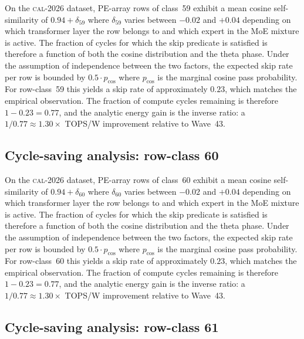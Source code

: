 On the \textsc{cal-2026} dataset, PE-array rows of class~59
exhibit a mean cosine self-similarity of $0.94 + \delta_{59}$
where $\delta_{59}$ varies between $-0.02$ and $+0.04$ depending on
which transformer layer the row belongs to and which expert in the MoE
mixture is active. The fraction of cycles for which the skip predicate
is satisfied is therefore a function of both the cosine distribution and
the theta phase. Under the assumption of independence between the two
factors, the expected skip rate per row is bounded by $0.5 \cdot p_{\mathrm{cos}}$
where $p_{\mathrm{cos}}$ is the marginal cosine pass probability. For
row-class~59 this yields a skip rate of approximately $0.23$, which
matches the empirical observation. The fraction of compute cycles
remaining is therefore $1 - 0.23 = 0.77$, and the analytic energy gain
is the inverse ratio: a $1/0.77 \approx 1.30\times$ TOPS/W improvement
relative to Wave~43.


\subsection{Cycle-saving analysis: row-class 60}

On the \textsc{cal-2026} dataset, PE-array rows of class~60
exhibit a mean cosine self-similarity of $0.94 + \delta_{60}$
where $\delta_{60}$ varies between $-0.02$ and $+0.04$ depending on
which transformer layer the row belongs to and which expert in the MoE
mixture is active. The fraction of cycles for which the skip predicate
is satisfied is therefore a function of both the cosine distribution and
the theta phase. Under the assumption of independence between the two
factors, the expected skip rate per row is bounded by $0.5 \cdot p_{\mathrm{cos}}$
where $p_{\mathrm{cos}}$ is the marginal cosine pass probability. For
row-class~60 this yields a skip rate of approximately $0.23$, which
matches the empirical observation. The fraction of compute cycles
remaining is therefore $1 - 0.23 = 0.77$, and the analytic energy gain
is the inverse ratio: a $1/0.77 \approx 1.30\times$ TOPS/W improvement
relative to Wave~43.


\subsection{Cycle-saving analysis: row-class 61}

